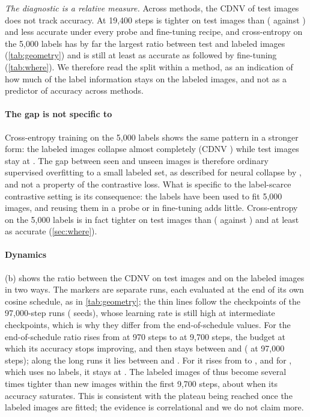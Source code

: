 \emph{The diagnostic is a relative measure.} Across methods, the CDNV of test images does not track accuracy.
At 19,400 steps \supcon is tighter on test images than \simclr ( against
) and less accurate under every probe and fine-tuning recipe, and cross-entropy on the 5,000 labels has
by far the largest ratio between test and labeled images (\cref{tab:geometry}) and is still at least as
accurate as \supcon followed by fine-tuning (\cref{tab:where}). We therefore read the split within a method, as an indication of
how much of the label information stays on the labeled images, and not as a predictor of accuracy across
methods.

\paragraph{The gap is not specific to \supcon}
Cross-entropy training on the 5,000 labels shows the same pattern in a stronger form: the labeled images
collapse almost completely (CDNV ) while test images stay at
. The gap between seen and unseen images is therefore ordinary supervised
overfitting to a small labeled set, as described for neural collapse by \citet{hui2022limitations}, and not
a property of the contrastive loss. What is specific to the label-scarce contrastive setting is its
consequence: the labels have been used to fit 5,000 images, and reusing them in a probe or in fine-tuning
adds little. Cross-entropy on the 5,000 labels is in fact tighter on test images than \supcon
( against ) and at least as accurate
(\cref{sec:where}).

\paragraph{Dynamics}
(b) shows the ratio between the CDNV on test images and on the labeled images in two ways.
The markers are separate runs, each evaluated at the end of its own cosine schedule, as in
\cref{tab:geometry}; the thin lines follow the checkpoints of the 97,000-step runs (
seeds), whose learning rate is still high at intermediate checkpoints, which is why they differ from the
end-of-schedule values. For \supcon the end-of-schedule ratio rises from  at 970 steps to
 at 9,700 steps, the budget at which its accuracy stops improving, and then stays
between  and  ( at 97,000
steps); along the long runs it lies between  and . For \union it
rises from  to , and for \simclr, which uses no labels, it stays at
. The labeled images of \supcon thus become several times
tighter than new images within the first 9,700 steps, about when its accuracy saturates. This is consistent
with the plateau being reached once the labeled images are fitted; the evidence is correlational and we do
not claim more.

